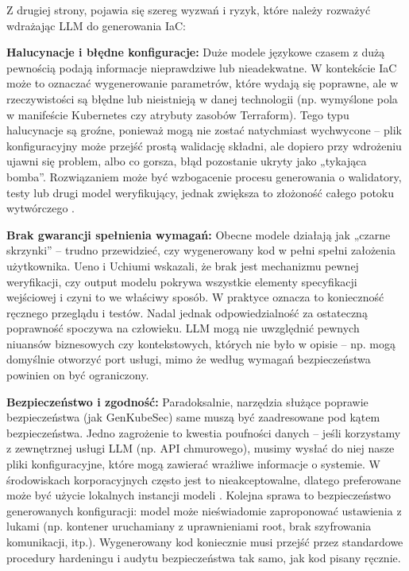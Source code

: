 Z drugiej strony, pojawia się szereg wyzwań i ryzyk, które należy rozważyć wdrażając LLM do generowania IaC:

\textbf{Halucynacje i błędne konfiguracje:} Duże modele językowe czasem z dużą pewnością podają informacje nieprawdziwe lub nieadekwatne. W kontekście IaC może to oznaczać wygenerowanie parametrów, które wydają się poprawne, ale w rzeczywistości są błędne lub nieistnieją w danej technologii (np. wymyślone pola w manifeście Kubernetes czy atrybuty zasobów Terraform). Tego typu halucynacje są groźne, ponieważ mogą nie zostać natychmiast wychwycone – plik konfiguracyjny może przejść prostą walidację składni, ale dopiero przy wdrożeniu ujawni się problem, albo co gorsza, błąd pozostanie ukryty jako „tykająca bomba”. Rozwiązaniem może być wzbogacenie procesu generowania o walidatory, testy lub drugi model weryfikujący, jednak zwiększa to złożoność całego potoku wytwórczego \cite{low_repairing_2024}.

\textbf{Brak gwarancji spełnienia wymagań:} Obecne modele działają jak „czarne skrzynki” – trudno przewidzieć, czy wygenerowany kod w pełni spełni założenia użytkownika. Ueno i Uchiumi \cite{ueno_migrating_2024} wskazali, że brak jest mechanizmu pewnej weryfikacji, czy output modelu pokrywa wszystkie elementy specyfikacji wejściowej i czyni to we właściwy sposób. W praktyce oznacza to konieczność ręcznego przeglądu i testów. Nadal jednak odpowiedzialność za ostateczną poprawność spoczywa na człowieku. LLM mogą nie uwzględnić pewnych niuansów biznesowych czy kontekstowych, których nie było w opisie – np. mogą domyślnie otworzyć port usługi, mimo że według wymagań bezpieczeństwa powinien on być ograniczony.

\textbf{Bezpieczeństwo i zgodność:} Paradoksalnie, narzędzia służące poprawie bezpieczeństwa (jak GenKubeSec) same muszą być zaadresowane pod kątem bezpieczeństwa. Jedno zagrożenie to kwestia poufności danych – jeśli korzystamy z zewnętrznej usługi LLM (np. API chmurowego), musimy wysłać do niej nasze pliki konfiguracyjne, które mogą zawierać wrażliwe informacje o systemie. W środowiskach korporacyjnych często jest to nieakceptowalne, dlatego preferowane może być użycie lokalnych instancji modeli \cite{malul_genkubesec_2024}. Kolejna sprawa to bezpieczeństwo generowanych konfiguracji: model może nieświadomie zaproponować ustawienia z lukami (np. kontener uruchamiany z uprawnieniami root, brak szyfrowania komunikacji, itp.). Wygenerowany kod koniecznie musi przejść przez standardowe procedury hardeningu i audytu bezpieczeństwa tak samo, jak kod pisany ręcznie.

